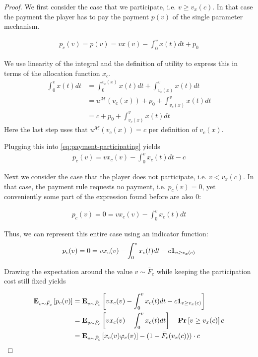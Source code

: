 \documentclass[11pt,a4paper]{article}
\renewcommand{\Pr}[1]{\mbox{\rm\bf Pr}\left[#1\right]}
\newcommand{\Ex}[2][]{\mbox{\rm\bf E}_{#1}\left[#2\right]}
\newcommand{\1}[1]{\mbox{\rm\bf 1}_{#1}}
\begin{document}
\begin{section}{}
\begin{proof}
     We first consider the case that we participate, i.e. $v \geq v_x(c)$.
     In that case the payment the player has to pay the payment $p(v)$ of the single parameter mechanism.

     \begin{align}
         \label{eq:payment-participating}
         p_c(v) = p(v) = v x(v) - \int_0^v x(t) dt + p_0
     \end{align}

     We use linearity of the integral and the definition of utility to express this in terms of the allocation function $x_c$.
     \begin{align*}
         \int_0^v x(t) dt & = \int_0^{v_c(x)} x(t) dt + \int_{v_c(x)}^v x(t) dt     \\
                          & = u^\mathcal{M}(v_c(x)) + p_0 + \int_{v_c(x)}^v x(t) dt \\
                          & = c + p_0 + \int_{v_c(x)}^v x(t) dt
     \end{align*}
     Here the last step uses that $u^\mathcal{M}(v_c(x)) = c$ per definition of $v_c(x)$.

     Plugging this into \autoref{eq:payment-participating} yields
     \begin{align*}
         p_c(v) = v x_c(v) - \int_0^v x_c(t) dt - c
     \end{align*}

     Next we consider the case that the player does not participate, i.e. $v < v_x(c)$.
     In that case, the payment rule requests no payment, i.e. $p_c(v) = 0$, yet conveniently some part of the expression found before are also $0$:

     \begin{align*}
         p_c(v) = 0 = v x_c(v) - \int_0^v x_c(t) dt
     \end{align*}

     Thus, we can represent this entire case using an indicator function:
     \begin{align*}
         p_c(v) = 0 = v x_c(v) - \int_0^v x_c(t) dt - c \1{v \geq v_x(c)}
     \end{align*}

     Drawing the expectation around the value $v \sim \bar{F}_c$ while keeping the participation cost still fixed yields

     \begin{align*}
         \Ex[v \sim \bar{F}_c]{p_c(v)} & = \Ex[v \sim \bar{F}_c]{v x_c(v) - \int_0^v x_c(t) dt - c \1{v \geq v_x(c)}}   \\
                                       & = \Ex[v \sim \bar{F}_c]{v x_c(v) - \int_0^v x_c(t) dt} - \Pr{v \geq v_x(c)}c   \\
                                       & = \Ex[v \sim \bar{F}_c]{x_c(v) \varphi_c(v)} - (1 - \bar{F}_c(v_x(c))) \cdot c \\
     \end{align*}


\end{proof}
\end{section}
\end{document}
